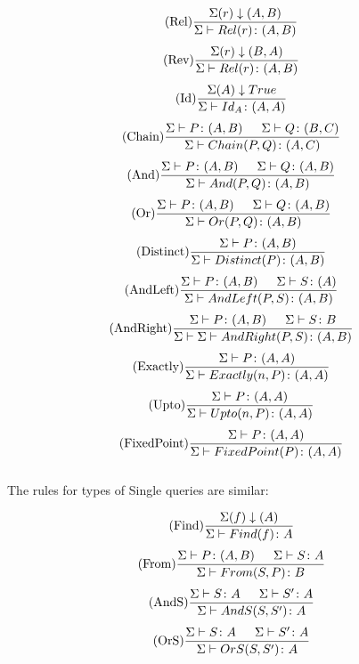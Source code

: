 \documentclass[twoside,a4paper,11pt]{article}
\newcommand{\typeRule}[2]{\Sigma\vdash #1 \colon #2}
\begin{document}
\[ \begin{array}{c}
\displaystyle\mbox{(Rel)}\frac{\Sigma(r)\downarrow(A, B)}{\typeRule{Rel(r)}{(A, B)}} \\[3ex]

\displaystyle\mbox{(Rev)}\frac{\Sigma(r)\downarrow(B, A)}{\typeRule{Rel(r)}{(A, B)}} \\[3ex]

\displaystyle\mbox{(Id)}\frac{\Sigma(A)\downarrow True}{\typeRule{Id_A}{(A, A)}} \\[3ex]

\displaystyle\mbox{(Chain)}\frac{\typeRule{P}{(A, B)} \indent \typeRule{Q}{(B, C)}}{\typeRule{Chain(P, Q)}{(A, C)}} \\[3ex]

\displaystyle\mbox{(And)}\frac{\typeRule{P}{(A, B)} \indent \typeRule{Q}{(A, B)}}{\typeRule{And(P, Q)}{(A, B)}} \\[3ex]

\displaystyle\mbox{(Or)}\frac{\typeRule{P}{(A, B)} \indent \typeRule{Q}{(A, B)}}{\typeRule{Or(P, Q)}{(A, B)}} \\[3ex]

\displaystyle\mbox{(Distinct)}\frac{\typeRule{P}{(A, B)}}{\typeRule{Distinct(P)}{(A, B)}} \\[3ex]

\displaystyle\mbox{(AndLeft)}\frac{\typeRule{P}{(A, B)} \indent \typeRule{S}{(A)}}{\typeRule{AndLeft(P,S)}{(A, B)}} \\[3ex]

\displaystyle\mbox{(AndRight)}\frac{\typeRule{P}{(A, B)} \indent \typeRule{S}{B}}{\Sigma \vdash \typeRule{AndRight(P, S)}{(A, B)}} \\[3ex]

\displaystyle\mbox{(Exactly)}\frac{\typeRule{P}{(A, A)}}{\typeRule{Exactly(n, P)}{(A, A)}} \\[3ex]

\displaystyle\mbox{(Upto)}\frac{\typeRule{P}{(A, A)}}{\typeRule{Upto(n, P)}{(A, A)}} \\[3ex]

\displaystyle\mbox{(FixedPoint)}\frac{\typeRule{P}{(A, A)}}{\typeRule{FixedPoint(P)}{(A, A)}} \\[3ex]

\end{array} \]


The rules for types of Single queries are similar:

\[ \begin{array}{c}
\displaystyle\mbox{(Find)}\frac{\Sigma(f)\downarrow(A)}{\typeRule{Find(f)}{A}} \\[3ex]

\displaystyle\mbox{(From)}\frac{\typeRule{P}{(A, B)} \indent \typeRule{S}{A}}{\typeRule{From(S, P)}{B}} \\[3ex]

\displaystyle\mbox{(AndS)}\frac{  \typeRule{S}{A} \indent  \typeRule{S'}{A}}{\typeRule{AndS(S, S')}{A}} \\[3ex]

\displaystyle\mbox{(OrS)}\frac{  \typeRule{S}{A} \indent  \typeRule{S'}{A}}{\typeRule{OrS(S, S')}{A}} \\[3ex]
\end{array}
\]
\end{document}
